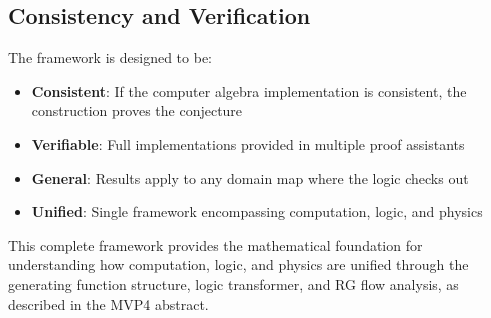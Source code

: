 \subsection{Consistency and Verification}

The framework is designed to be:
\begin{itemize}
\item \textbf{Consistent}: If the computer algebra implementation is consistent, the construction proves the conjecture
\item \textbf{Verifiable}: Full implementations provided in multiple proof assistants
\item \textbf{General}: Results apply to any domain map where the logic checks out
\item \textbf{Unified}: Single framework encompassing computation, logic, and physics
\end{itemize}

This complete framework provides the mathematical foundation for understanding how computation, logic, and physics are unified through the generating function structure, logic transformer, and RG flow analysis, as described in the MVP4 abstract.
